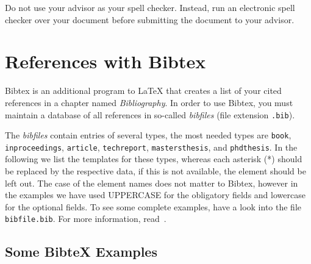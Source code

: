 Do not use your advisor as your spell checker. Instead, run an
electronic spell checker over your document before submitting the
document to your advisor.

\section{References with Bibtex}

Bibtex is an additional program to {\LaTeX} that creates a list of
your cited references in a chapter named {\em Bibliography}. In
order to use Bibtex, you must maintain a database of all references
in so-called \emph{bibfiles} (file extension \texttt{.bib}).

The \emph{bibfiles} contain entries of several types, the most
needed types are \texttt{book}, \texttt{inproceedings},
\texttt{article}, \texttt{techreport}, \texttt{mastersthesis}, and
\texttt{phdthesis}. In the following we list the templates for these
types, whereas each asterisk (*) should be replaced by the
respective data, if this is not available, the element should be
left out. The case of the element names does not matter to Bibtex,
however in the examples we have used UPPERCASE for the obligatory
fields and lowercase for the optional fields. To see some complete
examples, have a look into the file \texttt{bibfile.bib}. For more
information, read~\cite{patashnik:1988}.

\subsection{Some BibteX Examples}

